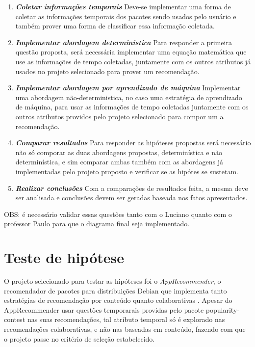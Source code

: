 \begin{enumerate}
    \item \textit{\textbf{Coletar informações temporais}}
Deve-se implementar uma forma de coletar as informações temporais dos pacotes sendo usados pelo usuário e também prover uma forma de classificar essa informação coletada.

    \item \textit{\textbf{Implementar abordagem deterministica}}
Para responder a primeira questão proposta, será necessária implementar uma equação matemática que use as informações de tempo coletadas, juntamente com os outros atributos já usados no projeto selecionado para prover um recomendação.

    \item \textit{\textbf{Implementar abordagem por aprendizado de máquina}}
Implementar uma abordagem não-deterministica, no caso uma estratégia de aprendizado de máquina, para usar as informações de tempo coletadas juntamente com os outros atributos providos pelo projeto selecionado para compor um a recomendação.

    \item \textit{\textbf{Comparar resultados}}
Para responder as hipóteses propostas será necessário não só comporar as duas abordagens propostas, determinística e não determinística, e sim comparar ambas também com as abordagens já implementadas pelo projeto proposto e verificar se as hipótes se sustetam.

    \item \textit{\textbf{Realizar conclusões}}
Com a comparações de resultados feita, a mesma deve ser analisada e conclusões devem ser geradas baseada nos fatos apresentados.
\end{enumerate}

OBS: é necessário validar essas questões tanto com o Luciano quanto com o professor Paulo para que o diagrama final seja implementado.

\section{Teste de hipótese}

O projeto selecionado para testar as hipóteses foi o \textit{AppRecommender}, o recomendador de pacotes para distribuições Debian que implementa tanto estratégias de recomendação por conteúdo quanto colaborativas \cite{araujo2011apprecommender}. 
Apesar do AppRecommender usar questões temporarais providas pelo pacote popularity-contest nas suas recomendações, tal atributo temporal só é explorado nas recomendações colaborativas, e não nas baseadas em conteúdo, fazendo com que o projeto passe no critério de seleção estabelecido.

